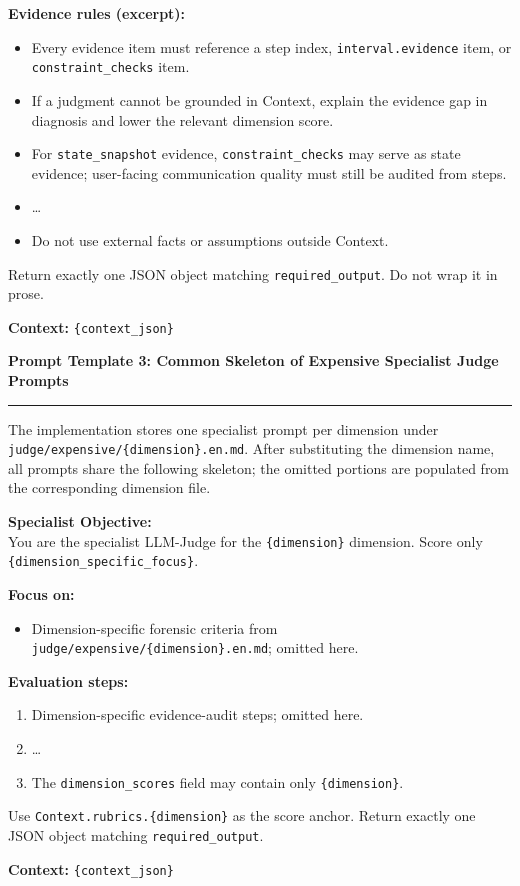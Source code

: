 \begin{tcolorbox}[colback=gray!4,colframe=black!75,arc=4pt,boxrule=0.8pt,left=8pt,right=8pt,top=6pt,bottom=6pt]
\textbf{Evidence rules (excerpt):}
\begin{itemize}[leftmargin=*,itemsep=1pt,topsep=1pt]
  \item Every evidence item must reference a step index, \texttt{interval.evidence} item, or \texttt{constraint\_checks} item.
  \item If a judgment cannot be grounded in Context, explain the evidence gap in diagnosis and lower the relevant dimension score.
  \item For \texttt{state\_snapshot} evidence, \texttt{constraint\_checks} may serve as state evidence; user-facing communication quality must still be audited from steps.
  \item \ldots{}
  \item Do not use external facts or assumptions outside Context.
\end{itemize}

Return exactly one JSON object matching \texttt{required\_output}. Do not wrap it in prose.

\textbf{Context:} \texttt{\{context\_json\}}
\end{tcolorbox}

\begin{tcolorbox}[colback=gray!4,colframe=black!75,arc=4pt,boxrule=0.8pt,left=8pt,right=8pt,top=6pt,bottom=6pt]
\textbf{Prompt Template 3: Common Skeleton of Expensive Specialist Judge Prompts} \\[-6pt]
\rule{\textwidth}{0.4pt}
\small
The implementation stores one specialist prompt per dimension under \texttt{judge/expensive/\{dimension\}.en.md}. After substituting the dimension name, all prompts share the following skeleton; the omitted portions are populated from the corresponding dimension file.

\textbf{Specialist Objective:} \\
You are the specialist LLM-Judge for the \texttt{\{dimension\}} dimension. Score only \texttt{\{dimension\_specific\_focus\}}.

\textbf{Focus on:}
\begin{itemize}[leftmargin=*,itemsep=1pt,topsep=1pt]
  \item Dimension-specific forensic criteria from \texttt{judge/expensive/\{dimension\}.en.md}; omitted here.
\end{itemize}

\textbf{Evaluation steps:}
\begin{enumerate}[leftmargin=*,itemsep=1pt,topsep=1pt]
  \item Dimension-specific evidence-audit steps; omitted here.
  \item \ldots{}
  \item The \texttt{dimension\_scores} field may contain only \texttt{\{dimension\}}.
\end{enumerate}

Use \texttt{Context.rubrics.\{dimension\}} as the score anchor. Return exactly one JSON object matching \texttt{required\_output}.

\textbf{Context:} \texttt{\{context\_json\}}
\end{tcolorbox}

